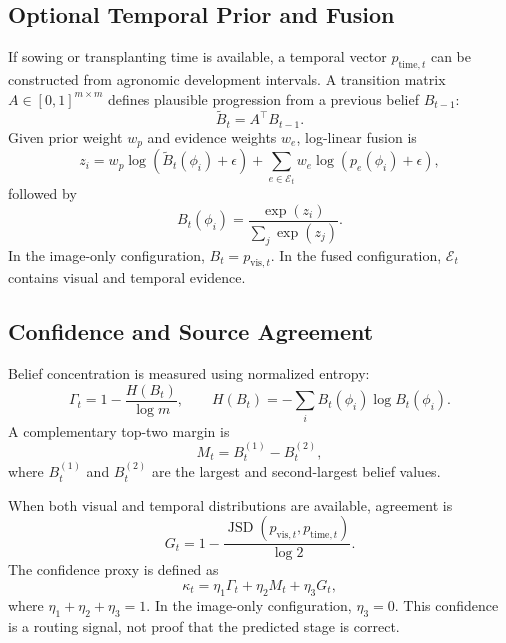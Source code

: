 \documentclass[conference]{IEEEtran}
\begin{document}
\subsection{Optional Temporal Prior and Fusion}
If sowing or transplanting time is available, a temporal vector $p_{\mathrm{time},t}$ can be constructed from agronomic development intervals. A transition matrix $A\in[0,1]^{m\times m}$ defines plausible progression from a previous belief $B_{t-1}$:
\begin{equation}
\widetilde{B}_t=A^{\top}B_{t-1}.
\end{equation}
Given prior weight $w_p$ and evidence weights $w_e$, log-linear fusion is
\begin{equation}
z_i=w_p\log(\widetilde{B}_t(\phi_i)+\epsilon)
+\sum_{e\in\mathcal{E}_t}w_e\log(p_e(\phi_i)+\epsilon),
\end{equation}
followed by
\begin{equation}
B_t(\phi_i)=\frac{\exp(z_i)}{\sum_j\exp(z_j)}.
\end{equation}
In the image-only configuration, $B_t=p_{\mathrm{vis},t}$. In the fused configuration, $\mathcal{E}_t$ contains visual and temporal evidence.

\subsection{Confidence and Source Agreement}
Belief concentration is measured using normalized entropy:
\begin{equation}
\Gamma_t=1-\frac{H(B_t)}{\log m},\qquad
H(B_t)=-\sum_i B_t(\phi_i)\log B_t(\phi_i).
\end{equation}
A complementary top-two margin is
\begin{equation}
M_t=B_t^{(1)}-B_t^{(2)},
\end{equation}
where $B_t^{(1)}$ and $B_t^{(2)}$ are the largest and second-largest belief values.

When both visual and temporal distributions are available, agreement is
\begin{equation}
G_t=1-\frac{\operatorname{JSD}(p_{\mathrm{vis},t},p_{\mathrm{time},t})}{\log 2}.
\end{equation}
The confidence proxy is defined as
\begin{equation}
\kappa_t=\eta_1\Gamma_t+\eta_2M_t+\eta_3G_t,
\end{equation}
where $\eta_1+\eta_2+\eta_3=1$. In the image-only configuration, $\eta_3=0$. This confidence is a routing signal, not proof that the predicted stage is correct.
\end{document}
